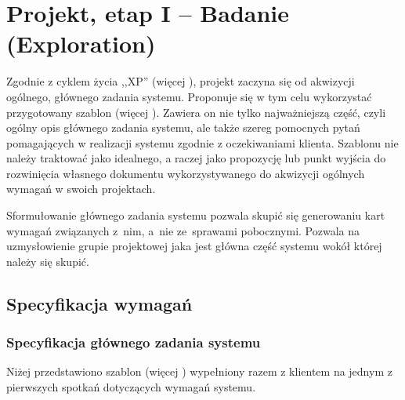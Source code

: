 \chapter{Projekt, etap I -- Badanie (Exploration)}
\label{cha:EtapI}

Zgodnie z cyklem życia ,,XP'' (więcej ), projekt zaczyna się od akwizycji ogólnego, głównego zadania systemu. Proponuje się w tym celu wykorzystać przygotowany szablon (więcej ). Zawiera on nie tylko najważniejszą część, czyli ogólny opis głównego zadania systemu, ale także szereg pomocnych pytań pomagających w realizacji systemu zgodnie z oczekiwaniami klienta. Szablonu nie należy traktować jako idealnego, a raczej jako propozycję lub punkt wyjścia do rozwinięcia własnego dokumentu wykorzystywanego do akwizycji ogólnych wymagań w swoich projektach.

Sformułowanie głównego zadania systemu pozwala skupić się generowaniu kart wymagań związanych z~nim, a~nie ze~sprawami pobocznymi. Pozwala na uzmysłowienie grupie projektowej jaka jest główna część systemu wokół której należy się skupić.

\section{Specyfikacja wymagań}
\label{sec:EtapIsw}

\subsection{Specyfikacja głównego zadania systemu}
\label{sec:EtapIswSGZS}

Niżej przedstawiono szablon (więcej ) wypełniony razem z klientem na jednym z pierwszych spotkań dotyczących wymagań systemu.

